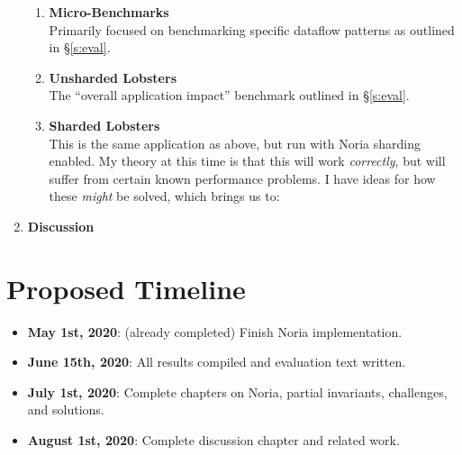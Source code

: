 \documentclass[fontsize=12pt,paper=letter]{scrartcl}
\begin{document}
\begin{enumerate}
\begin{enumerate}
   \item \textbf{Micro-Benchmarks}\\
     Primarily focused on benchmarking specific dataflow patterns as
     outlined in \S\ref{s:eval}.
   \item \textbf{Unsharded Lobsters}\\
     The ``overall application impact'' benchmark outlined in \S\ref{s:eval}.
   \item \textbf{Sharded Lobsters}\\
     This is the same application as above, but run with Noria sharding
     enabled. My theory at this time is that this will work \emph{correctly},
     but will suffer from certain known performance problems. I have
     ideas for how these \emph{might} be solved, which brings us to:
   \end{enumerate}
 \item \textbf{Discussion}
\end{enumerate}

\section{Proposed Timeline}

\begin{itemize}
 \item \textbf{May 1st, 2020}: (already completed) Finish Noria implementation.
 \item \textbf{June 15th, 2020}: All results compiled and evaluation text written.
 \item \textbf{July 1st, 2020}: Complete chapters on Noria, partial invariants, challenges, and solutions.
 \item \textbf{August 1st, 2020}: Complete discussion chapter and related work.
\end{itemize}

\printbibliography
\end{document}
